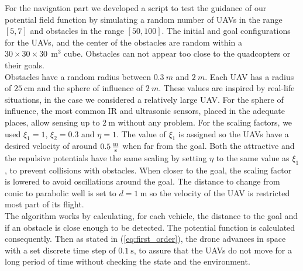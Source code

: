 \documentclass[journal]{IEEEtran}
\newcommand*{\subb}[1]{_{\mathrm{#1}}}
\begin{document}
	
	For the navigation part we developed a script to test the guidance of our potential field function by simulating a random number of UAVs in the range $[5,7]$ and obstacles in the range $[50,100]$. The initial and goal configurations for the UAVs, and the center of the obstacles are random within a $30\times 30\times 30   \ \SI{}{\meter^3}$ cube. Obstacles can not appear too close to the quadcopters or their goals.\\
	
	Obstacles have a random radius between $\SI{0.3}{m}$ and $\SI{2}{m}$. Each UAV has a radius of $\SI{25}{\centi\meter}$ and the sphere of influence of $\SI{2}{m}$. These values are inspired by real-life situations, in the case we considered a relatively large UAV. For the sphere of influence, the most common IR and ultrasonic sensors, placed in the adequate places, allow sensing up to $\SI{2}{\meter}$ without any problem. For the scaling factors, we used $\xi\subb{1} = 1$, $\xi\subb{2} = 0.3$ and $\eta = 1$. The value of $\xi\subb{1}$ is assigned so the UAVs have a desired velocity of around $\SI{0.5}{\frac{\meter}{\second}}$ when far from the goal. Both the attractive and the repulsive potentials have the same scaling by setting $\eta$ to the same value as $\xi\subb{1}$, to prevent collisions with obstacles. When closer to the goal, the scaling factor is lowered to avoid oscillations around the goal. The distance to change from conic to parabolic well is set to $d = \SI{1}{\meter}$ so the velocity of the UAV is restricted most part of its flight.\\
	
	The algorithm works by calculating, for each vehicle, the distance to the goal and if an obstacle is close enough to be detected. The potential function is calculated consequently. Then as stated in (\ref{eq:first_order}), the drone advances in space with a set discrete time step of $\SI{0.1}{\second}$, to assure that the UAVs do not move for a long period of time without checking the state and the environment.\\
\end{document}
